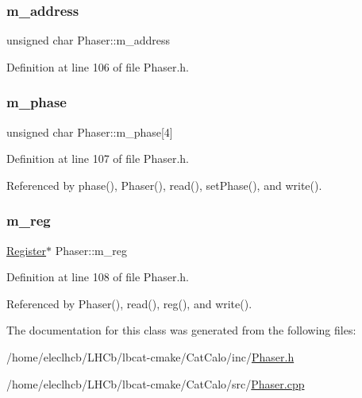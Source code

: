 \subsubsection{\texorpdfstring{m\+\_\+address}{m\_address}}
{\footnotesize\ttfamily unsigned char Phaser\+::m\+\_\+address\hspace{0.3cm}{\ttfamily [private]}}



Definition at line 106 of file Phaser.\+h.

\mbox{\label{classPhaser_a04df9ce4afe7a36ccaba5e5e727d504e}} 
\subsubsection{\texorpdfstring{m\+\_\+phase}{m\_phase}}
{\footnotesize\ttfamily unsigned char Phaser\+::m\+\_\+phase\mbox{[}4\mbox{]}\hspace{0.3cm}{\ttfamily [private]}}



Definition at line 107 of file Phaser.\+h.



Referenced by phase(), Phaser(), read(), set\+Phase(), and write().

\mbox{\label{classPhaser_ab6d751d77cb1e39723a6ac85d4cfec0c}} 
\subsubsection{\texorpdfstring{m\+\_\+reg}{m\_reg}}
{\footnotesize\ttfamily \hyperlink{classRegister}{Register}$\ast$ Phaser\+::m\+\_\+reg\hspace{0.3cm}{\ttfamily [private]}}



Definition at line 108 of file Phaser.\+h.



Referenced by Phaser(), read(), reg(), and write().



The documentation for this class was generated from the following files\+:\begin{DoxyCompactItemize}
\item 
/home/eleclhcb/\+L\+H\+Cb/lbcat-\/cmake/\+Cat\+Calo/inc/\hyperlink{Phaser_8h}{Phaser.\+h}\item 
/home/eleclhcb/\+L\+H\+Cb/lbcat-\/cmake/\+Cat\+Calo/src/\hyperlink{Phaser_8cpp}{Phaser.\+cpp}\end{DoxyCompactItemize}
